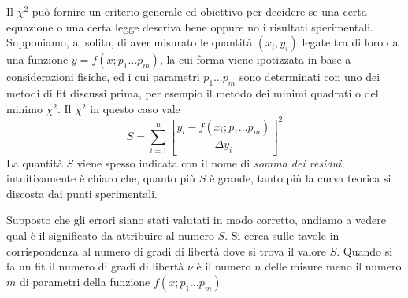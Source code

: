 Il $\chi^2$ pu\`o fornire un criterio generale ed obiettivo per decidere
se una certa equazione o una certa legge descriva bene oppure no i risultati
sperimentali.
Supponiamo, al solito, di aver misurato le quantit\`a $(x_i, y_i)$ legate
tra di loro da una funzione $y = f(x; p_1 \ldots p_m)$, la cui forma viene
ipotizzata in base a considerazioni fisiche, ed i cui parametri
$p_1 \ldots p_m$ sono determinati con uno dei metodi di fit discussi prima,
per esempio il metodo dei minimi quadrati o del minimo $\chi^2$.
Il $\chi^2$ in questo caso vale
$$
S=\sum_{i=1}^n \left[
\frac{y_i - f(x_i; p_1 \ldots p_m)}{\Delta y_i} \right]^2
$$
La quantit\`a $S$ viene spesso indicata con il nome di \emph{somma dei
residui}; intuitivamente \`e chiaro che, quanto pi\`u $S$ \`e grande, tanto
pi\`u la curva teorica si discosta dai punti sperimentali.

Supposto che gli errori siano stati valutati in modo corretto, andiamo a vedere
qual \`e il significato da attribuire al numero $S$.
Si cerca sulle tavole in corrispondenza al numero di gradi di libert\`a
dove si trova il valore $S$. Quando si fa un fit il numero di gradi di
libert\`a $\nu$ \`e il numero $n$ delle misure meno il numero $m$ di parametri
della funzione $f(x; p_1 \ldots p_m)$

\begin{exemplify}




\end{exemplify}

